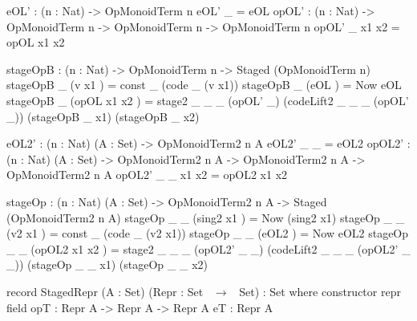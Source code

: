 \begin{togcode}  
  eOL' : (n : Nat) -> OpMonoidTerm n
  eOL' _ = eOL
  opOL' : (n : Nat) -> OpMonoidTerm n -> OpMonoidTerm n -> OpMonoidTerm n
  opOL' _ x1 x2 = opOL x1 x2

  stageOpB : (n : Nat) -> OpMonoidTerm n -> Staged (OpMonoidTerm n)
  stageOpB _ (v x1 ) = const _ (code _ (v x1))
  stageOpB _ (eOL ) = Now eOL
  stageOpB _ (opOL x1 x2 ) = 
       stage2 _ _ _ (opOL' _) 
             (codeLift2 _ _ _ (opOL' _)) 
             (stageOpB _ x1) (stageOpB _ x2)

  eOL2' : (n : Nat) (A : Set) -> OpMonoidTerm2 n A
  eOL2' _ _ = eOL2
  opOL2' : (n : Nat) (A : Set) -> OpMonoidTerm2 n A -> 
                     OpMonoidTerm2 n A -> OpMonoidTerm2 n A
  opOL2' _ _ x1 x2 = opOL2 x1 x2
   
  stageOp : (n : Nat) (A : Set) -> OpMonoidTerm2 n A -> 
                     Staged (OpMonoidTerm2 n A)
  stageOp _ _ (sing2 x1 ) = Now (sing2 x1)
  stageOp _ _ (v2 x1 ) = const _ (code _ (v2 x1))
  stageOp _ _ (eOL2 ) = Now eOL2
  stageOp _ _ (opOL2 x1 x2 ) = 
       stage2 _ _ _ (opOL2' _ _) 
             (codeLift2 _ _ _ (opOL2' _ _)) 
             (stageOp _ _ x1) (stageOp _ _ x2)
\end{togcode}
\begin{togcode} 
  record StagedRepr (A : Set) (Repr : Set ~$\to$~ Set) : Set where
   constructor repr
   field
    opT : Repr A -> Repr A -> Repr A
    eT  : Repr A

\end{togcode} 